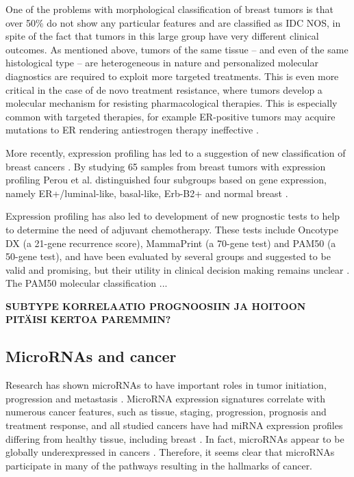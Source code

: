 One of the problems with morphological classification of breast tumors is that
over 50\% do not show any particular features and are classified as IDC NOS,
in spite of the fact that tumors in this large group have very different
clinical outcomes. As mentioned above, tumors of the same tissue -- and even
of the same histological type -- are heterogeneous in nature and personalized
molecular diagnostics are required to exploit more targeted treatments. This
is even more critical in the case of de novo treatment resistance, where
tumors develop a molecular mechanism for resisting pharmacological therapies.
This is especially common with targeted therapies, for example ER-positive
tumors may acquire mutations to ER rendering antiestrogen therapy ineffective
\citep{Oesterreich2013}.

More recently, expression profiling has led to a suggestion
of new classification of breast cancers \citep{Perou2000,Sorlie2001}. By studying 65
samples from breast tumors with expression profiling Perou et al.
distinguished four subgroups based on gene expression, namely
ER+/luminal-like, basal-like, Erb-B2+ and normal breast \citep{Perou2000}.

Expression profiling has also led to development of new prognostic tests to
help to determine the need of adjuvant chemotherapy. These tests include
Oncotype DX (a 21-gene recurrence score), MammaPrint (a 70-gene test) and PAM50
(a 50-gene test), and have been evaluated by several groups and suggested to be
valid and promising, but their utility in clinical decision making remains
unclear \citep{Azim2013}. The PAM50 molecular classification ... 

\textbf{SUBTYPE KORRELAATIO PROGNOOSIIN JA HOITOON PITÄISI KERTOA PAREMMIN?}






\subsection{MicroRNAs and cancer}

Research has shown microRNAs to have important roles in tumor initiation,
progression and metastasis \citep{Lin2015}. MicroRNA expression signatures
correlate with numerous cancer features, such as tissue, staging, 
progression, prognosis and treatment response, and all studied cancers
have had miRNA expression profiles differing from healthy tissue, including breast
\citep{Calin2006}. In fact, microRNAs appear to be globally underexpressed in
cancers \citep{Lu2005}. Therefore, it seems clear that microRNAs participate
in many of the pathways resulting in the hallmarks of cancer.

